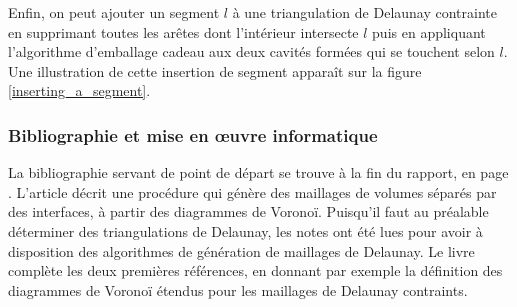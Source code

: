 \documentclass[12pt,a4paper]{report}
\begin{document}
Enfin, on peut ajouter un segment $l$ à une triangulation de Delaunay contrainte en supprimant toutes les arêtes dont l'intérieur intersecte $l$ puis en appliquant l'algorithme d'emballage cadeau aux deux cavités formées qui se touchent selon $l$. Une illustration de cette insertion de segment apparaît sur la figure \ref{inserting_a_segment}.

\vspace{1cm}
\subsubsection{Bibliographie et mise en \oe{}uvre informatique}

La bibliographie servant de point de départ se trouve à la fin du rapport, en page \pageref{biblio}. L'article \cite{Garimella} décrit une procédure qui génère des maillages de volumes séparés par des interfaces, à partir des diagrammes de Voronoï. Puisqu'il faut au préalable déterminer des triangulations de Delaunay, les notes \cite{delnotes} ont été lues pour avoir à disposition des algorithmes de génération de maillages de Delaunay. Le livre \cite{Edelsbrunner} complète les deux premières références, en donnant par exemple la définition des diagrammes de Voronoï étendus pour les maillages de Delaunay contraints.

\vspace{1cm}
\end{document}
